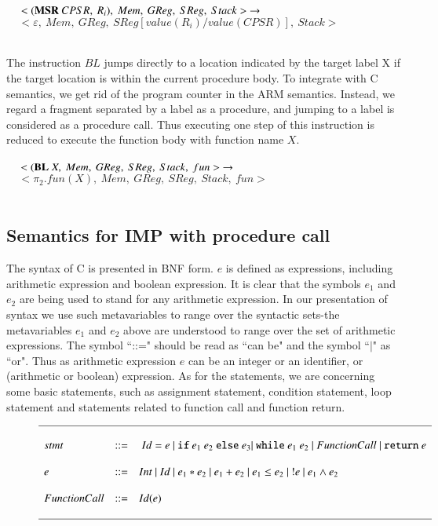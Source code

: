 \documentclass[letterpaper, 10 pt, conference]{IEEEtran}
\begin{document}
$~~~~~<(\textbf{MSR}~CPSR,~R_i),~Mem,~GReg,~SReg,~Stack>~\rightarrow\\ \\$
$~~~~~<\varepsilon,~Mem,~GReg,~SReg[value(R_i)/value(CPSR)],~Stack>$\\ \\
\par The instruction $BL$ jumps directly to a location indicated by the target label X if the target location is within the current procedure body. To integrate with C semantics, we get rid of the program counter in the ARM semantics. Instead, we regard a fragment separated by a label as a procedure, and jumping to a label is considered as a procedure call. Thus executing one step of this instruction is reduced to execute the function body with function name $X$.\\ \\
$~~~~~<(\textbf{BL}~X,~Mem,~GReg,~SReg,~Stack,~fun>~\rightarrow\\ \\$
$~~~~~<\pi_{2}.fun(X),~Mem,~GReg,~SReg,~Stack,~fun>$\\ \\
\subsection{Semantics for IMP with procedure call}

\par  The syntax of C is presented in BNF form. $e$ is defined as expressions, including arithmetic expression and boolean expression. It is clear that the symbols $e_1$ and $e_2$ are being used to stand for any arithmetic expression. In our presentation of syntax we use such metavariables to range over the syntactic sets-the metavariables $e_1$ and $e_2$ above are understood to range over the set of arithmetic expressions.  The symbol ``::=" should be read as ``can be" and the symbol ``$|$" as ``or". Thus as arithmetic expression $e$ can be an integer or an identifier, or (arithmetic or boolean) expression. As for the statements, we are concerning some basic statements, such as assignment statement, condition statement, loop statement and statements related to function call and function return.
\begin{figure*}
\begin{displaymath}
\small
\begin{array}{l l l}
\hline\\
stmt &::=&~Id=e ~|~ \texttt{if}~e_1~e_2~\texttt{else}~e_3 |~ \texttt{while}~e_1~e_2 ~|~ FunctionCall ~|~ \texttt{return}~e \\\\
e &::=&Int~|~Id~|~e_1*e_2~|~e_1+e_2~|~e_1\leq e_2~|~!e~|~e_1\land e_2\\\\
FunctionCall&::=&Id(e)\\\\

\hline

\end{array}
\end{displaymath}
\end{figure*}
\end{document}
